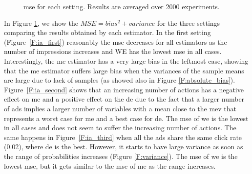 \begin{figure}[t]
\begin{minipage}{\textwidth}
    \caption[Internet Ads results]{\gls{mse} for each setting. Results are averaged over 2000 experiments.}\label{F:iAds}
    \end{minipage}
\end{figure}

In Figure \ref{F:iAds}, we show the $MSE = bias^2 + variance$ for the three settings comparing the results obtained by each estimator. 
In the first setting (Figure~\ref{F:ia_first}) reasonably the \gls{mse} decreases for all estimators as the number of impressions increases and WE has the lowest \gls{mse} in all cases. Interestingly, the \gls{me} estimator has a very large bias in the leftmost case, showing that the \gls{me} estimator suffers large bias when the variances of the sample means are large due to lack of samples (as showed also in Figure \ref{F:absolute_bias}).
Figure~\ref{F:ia_second} shows that an increasing number of actions has a negative effect on \gls{me} and a positive effect on the \gls{de} due to the fact that a larger number of ads implies a larger number of variables with a mean close to the \gls{mev} that represents a worst case for \gls{me} and a best case for \gls{de}. 
The \gls{mse} of \gls{we} is the lowest in all cases and does not seem to suffer the increasing number of actions. 
The same happens in Figure~\ref{F:ia_third} when all the ads share the same click rate (0.02), where \gls{de} is the best.
However, it starts to have large variance as soon as the range of probabilities increases (Figure \ref{F:variance}). 
The \gls{mse} of \gls{we} is the lowest \gls{mse}, but it gets similar to the \gls{mse} of \gls{me} as the range increases.

